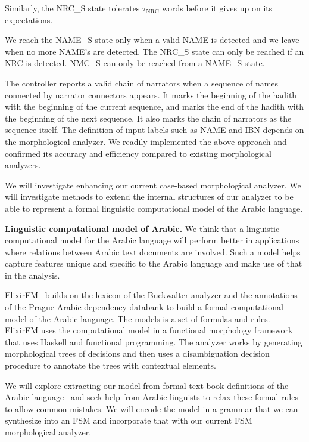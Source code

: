 \documentclass[12pt]{article}
\begin{document}
Similarly, the NRC\_S state tolerates $\tau_{\mbox{NRC}}$ words 
before it gives up on its expectations. 

We reach the NAME\_S state only when a
valid NAME is detected and we leave when no more NAME's 
are detected. 
The NRC\_S state can only be reached if an NRC is detected.
NMC\_S can only be reached from a NAME\_S state.

The controller reports a valid chain of narrators when a 
sequence of names
connected by narrator connectors appears. 
It marks the beginning of the hadith with the beginning of the 
current sequence,
and marks the end of the hadith with the beginning of the next 
sequence. 
It also marks the chain of narrators as the sequence itself. 
The definition of input labels such as NAME and IBN depends on 
the morphological analyzer. 
We readily implemented the above approach and confirmed its 
accuracy and efficiency compared to existing morphological
analyzers. 

We will investigate enhancing our current case-based morphological
analyzer.
We will investigate methods to extend the internal structures 
of our analyzer to be able to represent a formal linguistic
computational model of the Arabic language. 

{\bf Linguistic computational model of Arabic.}
We think that a linguistic computational model for the Arabic
language will perform better in applications where
relations between Arabic text documents are involved. 
Such a model helps capture features unique and specific 
to the Arabic language and make use of that in the analysis.

ElixirFM~\cite{Otakar:07} builds on the lexicon
of the Buckwalter analyzer and the annotations of the 
Prague Arabic dependency databank to build a formal 
computational model of the Arabic language.
The models is a set of formulas and rules. 
ElixirFM uses the computational model in a functional
morphology framework that uses Haskell and functional
programming. 
The analyzer works by generating morphological trees of 
decisions and then uses a disambiguation decision procedure 
to annotate the trees with contextual elements. 

We will explore extracting our model from formal text book
definitions of the Arabic language~\cite{Abd00,Abd001} and seek
help from Arabic linguists to relax these formal rules to
allow common mistakes. 
We will encode the model in a grammar that we can synthesize
into an FSM and incorporate that with our current FSM 
morphological analyzer. 
\end{document}
